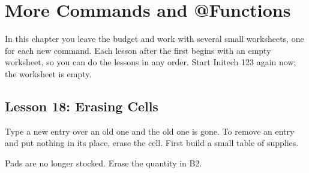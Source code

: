 \chapter{More Commands and @Functions}

In this chapter you leave the budget and work with several small
worksheets, one for each new command.  Each lesson after the first begins
with an empty worksheet, so you can do the lessons in any order.  Start
Initech 123 again now; the worksheet is empty.

\section{Lesson 18: Erasing Cells}
Type a new entry over an old one and the old one is gone.  To remove an
entry and put nothing in its place, erase the cell.  First build a small
table of supplies.

\begin{Keystrokes}
\end{Keystrokes}
Pads are no longer stocked.  Erase the quantity in B2.

